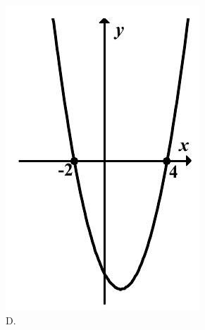 \documentclass[10pt]{article}
\begin{document}
\includegraphics[max width=\textwidth, center]{2024_11_21_5b6b7ffa9006e3f448adg-04(2)}\\
D.\\
\end{document}
